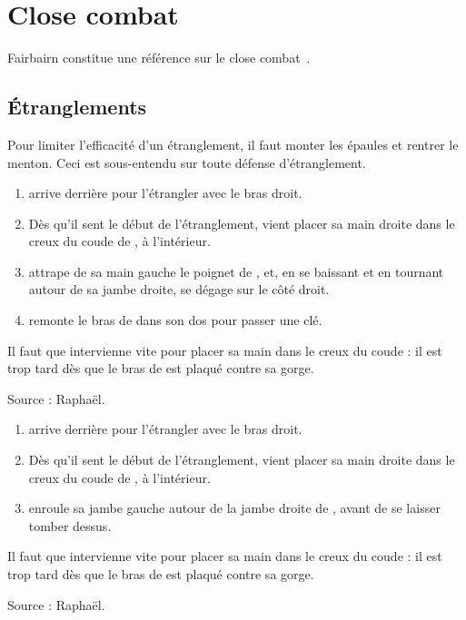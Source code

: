 \chapter{Close combat}

Fairbairn constitue une référence sur le close combat~\cite{fairbairn:allin:2008}.



\section{Étranglements}

Pour limiter l'efficacité d'un étranglement, il faut monter les épaules et rentrer le menton.
Ceci est sous-entendu sur toute défense d'étranglement.


\begin{technique}

\begin{enumerate}
	\item \A arrive derrière \D pour l'étrangler avec le bras droit.
	
	\item Dès qu'il sent le début de l'étranglement, \D vient placer sa main droite dans le creux du coude de \A, à l'intérieur.
	
	\item \D attrape de sa main gauche le poignet de \A, et, en se baissant et en tournant autour de sa jambe droite, se dégage sur le côté droit.
	
	\item \D remonte le bras de \A dans son dos pour passer une clé.
\end{enumerate}

Il faut que \D intervienne vite pour placer sa main dans le creux du coude : il est trop tard dès que le bras de \A est plaqué contre sa gorge.

Source : Raphaël.

\end{technique}


\begin{technique}

\begin{enumerate}
	\item \A arrive derrière \D pour l'étrangler avec le bras droit.
	
	\item Dès qu'il sent le début de l'étranglement, \D vient placer sa main droite dans le creux du coude de \A, à l'intérieur.
	
	\item {} \D enroule sa jambe gauche autour de la jambe droite de \A, avant de se laisser tomber dessus.
\end{enumerate}

Il faut que \D intervienne vite pour placer sa main dans le creux du coude : il est trop tard dès que le bras de \A est plaqué contre sa gorge.

Source : Raphaël.

\end{technique}


